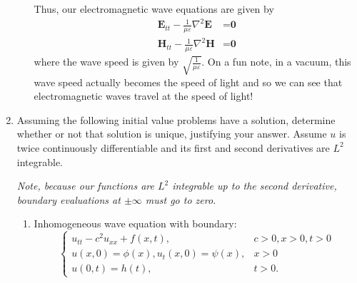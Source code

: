 \documentclass[a4paper,12pt]{article}
\begin{document}
\begin{enumerate}[label = \arabic*.]
\begin{enumerate}[label = (\alph*)]
		Thus, our electromagnetic wave equations are given by 
		\begin{align*}
			\textbf{E}_{tt} - \frac{1}{\mu \varepsilon} \nabla^2 \textbf{E} &= \textbf{0} \\
			\textbf{H}_{tt} - \frac{1}{\mu \varepsilon} \nabla^2 \textbf{H} &= \textbf{0}
		\end{align*}
		where the wave speed is given by $ \sqrt{\frac{1}{\mu \varepsilon}} $. On a fun note, in a vacuum, this wave speed actually becomes the speed of light and so we can see that electromagnetic waves travel at the speed of light!
	\end{enumerate}	
	
	\item Assuming the following initial value problems have a solution, determine whether or not that solution is unique, justifying your answer. Assume $ u $ is twice continuously differentiable and its first and second derivatives are $ L^2 $ integrable.
	
	\textit{Note, because our functions are $ L^2 $ integrable up to the second derivative, boundary evaluations at $ \pm\infty $ must go to zero.}
	\begin{enumerate}[label = (\alph*)]
		\item Inhomogeneous wave equation with boundary:
		\[	
			\begin{cases}
				u_{tt} - c^2 u_{xx} + f(x,t), & c > 0, x > 0, t > 0 \\
				u(x,0) = \phi(x), u_t(x,0) = \psi(x), & x > 0 \\
				u(0, t) = h(t), & t > 0.
			\end{cases}
		\]
		

\end{enumerate}
\end{enumerate}
\end{document}
